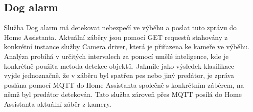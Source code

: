 
\subsection{Dog alarm}\label{subsec:dog-alarm}
Služba Dog alarm má detekovat nebezpečí ve výběhu a poslat tuto zprávu do Home Assistanta.\newline
Aktuální záběry jsou pomocí GET requestů stahovány z konkrétní instance služby Camera driver, která je přiřazena ke kameře ve výběhu.
Analýza probíhá v určitých intervalech za pomocí umělé inteligence, kde je konkrétně použita metoda detekce objektů.
Jakmile jako výsledek klasifikace vyjde jednoznačně, že v záběru byl spatřen pes nebo jiný predátor, je zpráva poslána pomocí MQTT do Home Assistanta společně s konkrétním záběrem, na němž byl predátor detekován.
Tato služba zároveň přes MQTT posílá do Home Assistanta aktuální záběr z kamery.